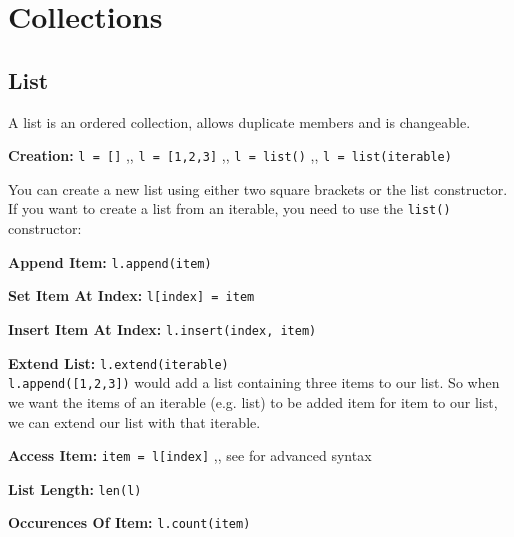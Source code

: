 \section{Collections} \label{Collections}

    \subsection{List} \label{List}
        A list is an ordered collection, allows duplicate members and is changeable.

        \begin{indentblock}

            \textbf{Creation:} \texttt{l = []} \sep{,} \texttt{l = [1,2,3]}
            \sep{,} \texttt{l = list()} \sep{,} \texttt{l = list(iterable)}

            You can create a new list using either two square brackets or the list constructor.
            If you want to create a list from an iterable, you need to use the
            \texttt{list()} constructor:


            \textbf{Append Item:} \texttt{l.append(item)}

            \textbf{Set Item At Index:} \texttt{l[index] = item}

            \textbf{Insert Item At Index:} \texttt{l.insert(index, item)}

            \textbf{Extend List:} \texttt{l.extend(iterable)} \\
            \texttt{l.append([1,2,3])} would add a list containing three items to our list.
            So when we want the items of an iterable (e.g. list) to be added item for item to our list,
            we can extend our list with that iterable.


            \textbf{Access Item:} \texttt{item = l[index]} \sep{,}
            see  for advanced syntax

            \textbf{List Length:} \texttt{len(l)}

            \textbf{Occurences Of Item:} \texttt{l.count(item)}


\end{indentblock}
